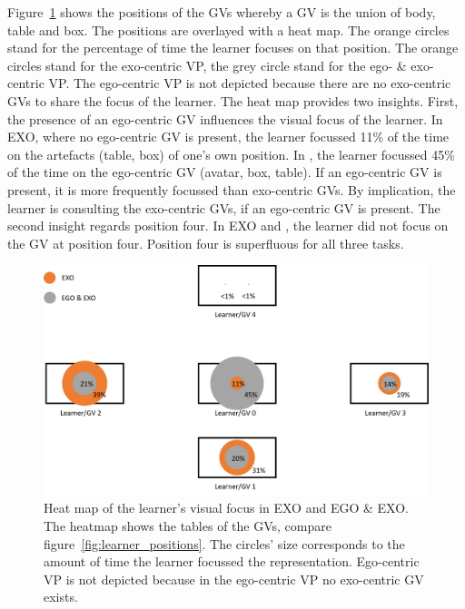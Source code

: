 Figure~\ref{fig:posHeatMap} shows the positions of the GVs whereby a GV is the union of body, table and box. The positions are overlayed with a heat map. The orange circles stand for the percentage of time the learner focuses on that position. The orange circles stand for the exo-centric VP, the grey circle stand for the ego- \& exo-centric VP. The ego-centric VP is not depicted because there are no exo-centric GVs to share the focus of the learner. The heat map provides two insights. First, the presence of an ego-centric GV influences the visual focus of the learner. In EXO, where no ego-centric GV is present, the learner focussed 11\% of the time on the artefacts (table, box) of one's own position. In \combi, the learner focussed 45\% of the time on the ego-centric GV (avatar, box, table). If an ego-centric GV is present, it is more frequently focussed than exo-centric GVs. By implication, the learner is consulting the exo-centric GVs, if an ego-centric GV is present.
The second insight regards position four. In EXO and \combi, the learner did not focus on the GV at position four. Position four is superfluous for all three tasks.
\begin{figure}[htb]
	\centering
	\includegraphics[width=\textwidth]{figures/positionHeatMap.png}
	\caption[\textit{Looking at} heat map.]{Heat map of the learner's visual focus in EXO and EGO \& EXO. The heatmap shows the tables of the GVs, compare figure~\ref{fig:learner_positions}. The circles' size corresponds to the amount of time the learner focussed the representation. Ego-centric VP is not depicted because in the ego-centric VP no exo-centric GV exists.}
	\label{fig:posHeatMap}
\end{figure}

